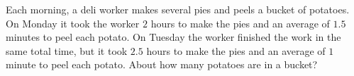 Each morning, a deli worker makes several pies and peels a bucket of potatoes. On Monday it took the worker $2$ hours to make the pies and an average of $1.5$ minutes to peel each potato. On Tuesday the worker finished the work in the same total time, but it took $2.5$ hours to make the pies and an average of $1$ minute to peel each potato. About how many potatoes are in a bucket?
